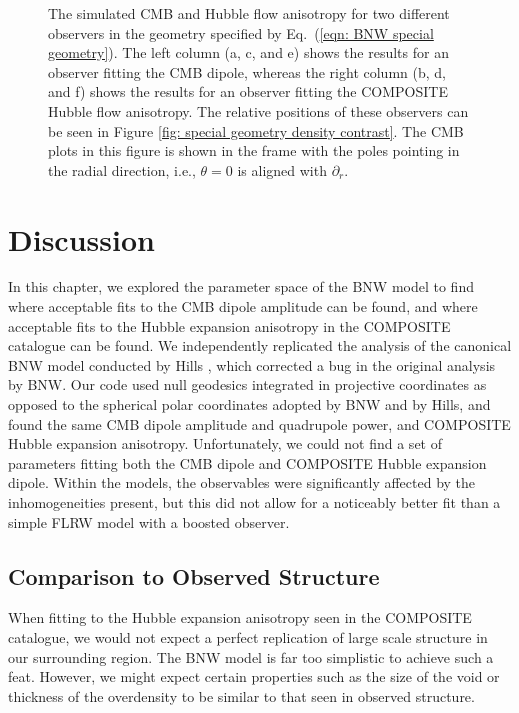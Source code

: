 \documentclass[a4paper,12pt]{report}
\renewcommand{\eqref}[1]{Eq.~({#1})}
\begin{document}
\begin{figure}[t]
\begin{subfigure}[b]{0.45\textwidth}
        \caption{}
    \end{subfigure}
    \caption{The simulated CMB and Hubble flow anisotropy for two different observers in the geometry specified by \eqref{\ref{eqn: BNW special geometry}}. The left column (a, c, and e) shows the results for an observer fitting the CMB dipole, whereas the right column (b, d, and f) shows the results for an observer fitting the COMPOSITE Hubble flow anisotropy. The relative positions of these observers can be seen in Figure \ref{fig: special geometry density contrast}. The CMB plots in this figure is shown in the frame with the poles pointing in the radial direction, i.e., $\theta=0$ is aligned with $\partial_r$.}
    \label{fig: special geometry different observers}
\end{figure}


\section{Discussion}
In this chapter, we explored the parameter space of the BNW model to find where acceptable fits to the CMB dipole amplitude can be found, and where acceptable fits to the Hubble expansion anisotropy in the COMPOSITE catalogue can be found. We independently replicated the analysis of the canonical BNW model conducted by Hills \cite{RN42}, which corrected a bug in the original analysis by BNW. Our code used null geodesics integrated in projective coordinates as opposed to the spherical polar coordinates adopted by BNW and by Hills, and found the same CMB dipole amplitude and quadrupole power, and COMPOSITE Hubble expansion anisotropy.
Unfortunately, we could not find a set of parameters fitting both the CMB dipole and COMPOSITE Hubble expansion dipole. Within the models, the observables were significantly affected by the inhomogeneities present, but this did not allow for a noticeably better fit than a simple FLRW model with a boosted observer.

\subsection{Comparison to Observed Structure}
When fitting to the Hubble expansion anisotropy seen in the COMPOSITE catalogue, we would not expect a perfect replication of large scale structure in our surrounding region. The BNW model is far too simplistic to achieve such a feat. However, we might expect certain properties such as the size of the void or thickness of the overdensity to be similar to that seen in observed structure.
\end{document}
